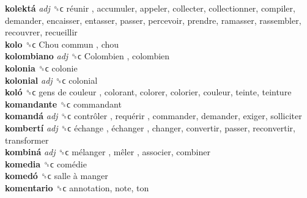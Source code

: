 \textbf{kolektá} \emph{adj}  ␝ϲ   réunir , accumuler, appeler, collecter, collectionner, compiler, demander, encaisser, entasser, passer, percevoir, prendre, ramasser, rassembler, recouvrer, recueillir  \\
\textbf{kolo} ␝ϲ   Chou commun , chou  \\
\textbf{kolombiano} \emph{adj}  ␝ϲ   Colombien , colombien  \\
\textbf{kolonia} ␝ϲ  colonie  \\
\textbf{kolonial} \emph{adj}  ␝ϲ  colonial  \\
\textbf{koló} ␝ϲ   gens de couleur , colorant, colorer, colorier, couleur, teinte, teinture  \\
\textbf{komandante} ␝ϲ  commandant  \\
\textbf{komandá} \emph{adj}  ␝ϲ   contrôler ,  requérir , commander, demander, exiger, solliciter  \\
\textbf{kombertí} \emph{adj}  ␝ϲ   échange ,  échanger , changer, convertir, passer, reconvertir, transformer  \\
\textbf{kombiná} \emph{adj}  ␝ϲ   mélanger ,  mêler , associer, combiner  \\
\textbf{komedia} ␝ϲ   comédie   \\
\textbf{komedó} ␝ϲ   salle à manger   \\
\textbf{komentario} ␝ϲ  annotation, note, ton  \\
